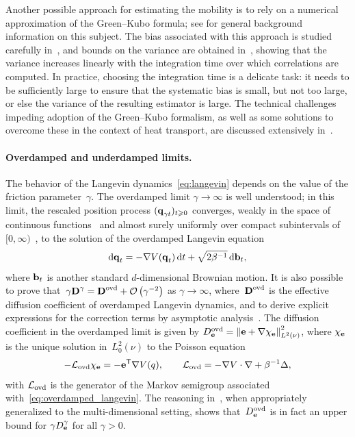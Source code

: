 \documentclass[11pt,a4paper]{article}
\begin{document}
Another possible approach for estimating the mobility is to rely on a numerical approximation of the Green--Kubo formula;
see \cite[Section 5.1.3]{MR3509213} for general background information on this subject.
The bias associated with this approach is studied carefully in~\cite{LMS16},
and bounds on the variance are obtained in~\cite{PSW21},
showing that the variance increases linearly with the integration time over which correlations are computed.
In practice, choosing the integration time is a delicate task:
it needs to be sufficiently large to ensure that the systematic bias is small,
but not too large, or else the variance of the resulting estimator is large.
The technical challenges impeding adoption of the Green--Kubo formalism,
as well as some solutions to overcome these in the context of heat transport,
are discussed extensively in~\cite{ercole2017accurate,Baroni2020}.

\paragraph{Overdamped and underdamped limits.}
The behavior of the Langevin dynamics~\eqref{eq:langevin} depends on the value of the friction parameter~$\gamma$.
The overdamped limit $\gamma \to \infty$ is well understood;
in this limit, the rescaled position process $(\boldsymbol{\mathbf q}_{\gamma t})_{t \geqslant 0}$
converges, weakly in the space of continuous functions~\cite{MR4054345}
and almost surely uniformly over compact subintervals of $[0, \infty)$~\cite[Theorem 10.1]{MR0214150},
to the solution of the overdamped Langevin equation
\begin{equation}
    \label{eq:overdamped_langevin}
    \mathrm d \boldsymbol{\mathbf q}_t = - \nabla V(\boldsymbol{\mathbf q}_t) \, \mathrm d t + \sqrt{2 \beta^{-1}} \, \mathrm d \boldsymbol{\mathbf b}_t,
\end{equation}
where $\boldsymbol{\mathbf b}_t$ is another standard $d$-dimensional Brownian motion.
It is also possible to prove that~$\gamma \mat D^{\gamma} = \mat D^{\rm ovd} + \bigo{\gamma^{-2}}$ as $\gamma \to \infty$,
where~$\boldsymbol{\mathbf D}^{\rm ovd}$ is the effective diffusion coefficient of overdamped Langevin dynamics,
and to derive explicit expressions for the correction terms by asymptotic analysis~\cite{MR2394704}.
The diffusion coefficient in the overdamped limit is given by $D^{\rm ovd}_{\vect e} = \norm{\vect e + \grad \chi_{\vect e}}[L^2(\nu)]^2$,
where $\chi_{\boldsymbol{\mathbf e}}$ is the unique solution in~$L^2_0(\nu)$ to the Poisson equation
\[
    - \mathcal L_{\rm ovd} \chi_{\boldsymbol{\mathbf e}} = - \boldsymbol{\mathbf e}^\mathsf T \nabla V(q), \qquad \mathcal L_{\rm ovd} = - \nabla V \cdot \nabla + \beta^{-1} \Delta,
\]
with $\mathcal L_{\rm ovd}$ is the generator of the Markov semigroup associated with~\eqref{eq:overdamped_langevin}.
The reasoning in~\cite[Proposition 4.1]{MR2394704},
when appropriately generalized to the multi-dimensional setting,
shows that~$D^{\rm ovd}_{\boldsymbol{\mathbf e}}$ is in fact an upper bound for $\gamma D^{\gamma}_{\boldsymbol{\mathbf e}}$ for all $\gamma > 0$.
\end{document}

